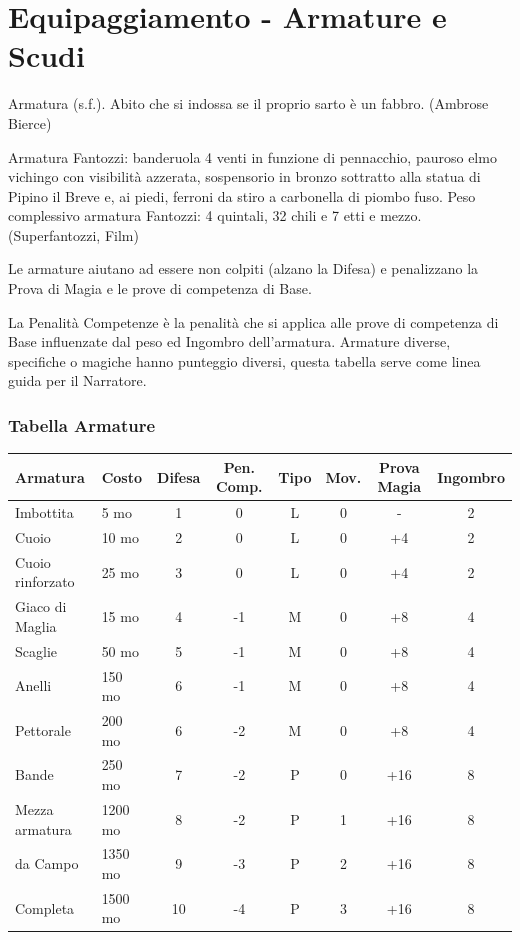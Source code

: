 \section{Equipaggiamento - Armature e Scudi} \hypertarget{equipaggiamento.armature.scudi}{}\label{equipaggiamentoarmature}

\label{equipaggiamento---armature-e-scudi}

\begin{enfasi}{
Armatura (s.f.). Abito che si indossa se il proprio sarto è un fabbro. (Ambrose Bierce)

\medskip

Armatura Fantozzi: banderuola 4 venti in funzione di pennacchio, pauroso elmo vichingo con visibilità azzerata, sospensorio in bronzo sottratto alla statua di Pipino il Breve e, ai piedi, ferroni da stiro a carbonella di piombo fuso. Peso complessivo armatura Fantozzi: 4 quintali, 32 chili e 7 etti e mezzo. (Superfantozzi, Film)} \end{enfasi}

Le armature aiutano ad essere non colpiti (alzano la Difesa) e penalizzano la Prova di Magia e le prove di competenza di Base.

La Penalità Competenze è la penalità che si applica alle prove di competenza di Base influenzate dal peso ed Ingombro dell'armatura. Armature diverse, specifiche o magiche hanno punteggio diversi, questa tabella serve come linea guida per il Narratore.

\subsubsection{Tabella Armature}

\label{tabella-armature}
\noindent\begin{tabularx}{\linewidth}{llcccccc}
	\toprule
\rowcolor{gray!20}\textbf{Armatura} & \textbf{Costo} & \textbf{Difesa} & \textbf{Pen. Comp.} & \textbf{Tipo} & \textbf{Mov.} & \textbf{Prova Magia}&\textbf{Ingombro}\\
\toprule
Imbottita & 5 mo & 1 & 0 & L 	& 		0 		& -		&2\\
\rowcolor{gray!20}Cuoio & 10 mo & 2 & 0 & L 		& 		0 		& +4		&2\\
Cuoio rinforzato& 25 mo& 3 & 0& L 	& 0 		& +4		&2\\
\rowcolor{gray!20}Giaco di Maglia & 15 mo & 4 & -1 & M & 0 		&+8			&4\\
Scaglie& 50 mo & 5& -1& M & 0 					&+8			&4\\
\rowcolor{gray!20}Anelli & 150 mo & 6& -1& M & 0 					&+8			&4\\
Pettorale& 200 mo & 6& -2& M & 0 				&+8			&4\\
\rowcolor{gray!20}Bande & 250 mo & 7& -2& P & 0 					&+16		&8\\
Mezza armatura& 1200 mo& 8& -2& P & 1 			&+16		&8\\
\rowcolor{gray!20}da Campo& 1350 mo& 9& -3& P & 2 				&+16		&8\\
Completa& 1500 mo& 10 & -4& P & 3 				&+16		&8
\end{tabularx}

